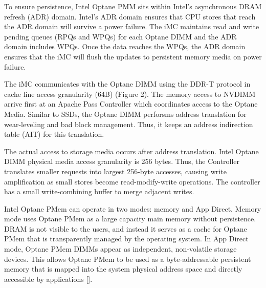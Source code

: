 To ensure persistence, Intel Optane PMM sits within Intel’s asynchronous DRAM refresh (ADR) domain. Intel’s ADR domain ensures that CPU stores that reach the ADR domain will survive a power failure. The iMC maintains read and write pending queues (RPQs and WPQs) for each Optane DIMM and the ADR domain includes WPQs. Once the data reaches the WPQs, the ADR domain ensures that the iMC will flush the updates to persistent memory media on power failure.

The iMC communicates with the Optane DIMM using the DDR-T protocol in cache line access granularity (64B) (Figure 2). The memory access to NVDIMM arrive first at an Apache Pass Controller which coordinates access to the Optane Media. Similar to SSDs, the Optane DIMM perforsms address translation for wear-leveling and bad block management. Thus, it keeps an address indirection table (AIT) for this translation. 

The actual access to storage media occurs after address translation. Intel Optane DIMM physical media access granularity is 256 bytes. Thus, the Controller translates smaller requests into largest 256-byte accesses, causing write amplification as small stores become read-modify-write operations. The controller has a small write-combining buffer to merge adjacent writes.

Intel Optane PMem can operate in two modes: memory and App Direct. Memory mode uses Optane PMem as a large capacity main memory without persistence. DRAM is not visible to the users, and instead it serves as a cache for Optane PMem that is transparently managed by the operating system. In App Direct mode, Optane PMem DIMMs appear as independent, non-volatile storage devices. This allows Optane PMem to be used as a byte-addressable persistent memory that is mapped into the system physical address space and directly accessible by applications [].


